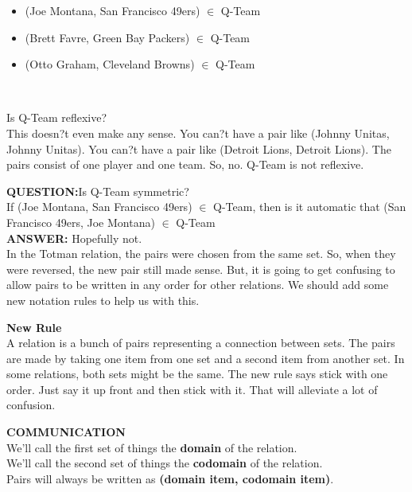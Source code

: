 \documentclass{ximera}
\begin{document}
\begin{example}
\begin{itemize}
 \item (Joe Montana, San Francisco 49ers) $\in$ Q-Team
 \item (Brett Favre, Green Bay Packers) $\in$ Q-Team
 \item (Otto Graham, Cleveland Browns) $\in$ Q-Team
\end{itemize}
\end{example}

\quad \\


\begin{dialogue}
[QUESTION:] Is Q-Team reflexive? \\
[ANSWER:]This doesn?t even make any sense.  You can?t have a pair like (Johnny Unitas, Johnny Unitas). You can?t have a pair like (Detroit Lions, Detroit Lions).  The pairs consist of one player and one team. So, no. Q-Team is not reflexive.
\end{dialogue}

\textbf{QUESTION:}Is Q-Team symmetric?\\
If (Joe Montana, San Francisco 49ers) $\in$ Q-Team, then is it automatic that (San Francisco 49ers, Joe Montana) $\in$ Q-Team\\
\textbf{ANSWER:} Hopefully not. \\
In the Totman relation, the pairs were chosen from the same set.  So, when they were reversed, the new pair still made sense.  But, it is going to get confusing to allow pairs to be written in any order for other relations. We should add some new notation rules to help us with this.


\textbf{New Rule} \\
A relation is a bunch of pairs representing a connection between sets.  The pairs are made by taking one item from one set and a second item from another set. In some relations, both sets might be the same.  The new rule says stick with one order.  Just say it up front and then stick with it.  That will alleviate a lot of confusion.



\begin{remark} \textbf{COMMUNICATION} \\
We'll call the first set of things the \textbf{domain} of the relation. \\
We'll call the second set of things the \textbf{codomain} of the relation.  \\
Pairs will always be written as \textbf{(domain item, codomain item)}.
\end{remark}
\end{document}
